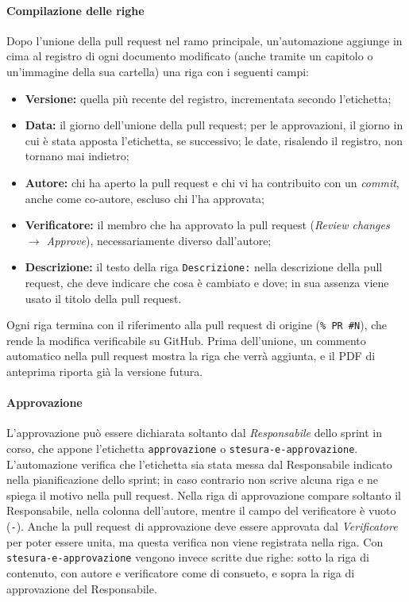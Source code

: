 \documentclass[documento]{gpt}
\begin{document}
	\paragraph{Compilazione delle righe}
	Dopo l'unione della pull request nel ramo principale, un'automazione aggiunge in cima al registro di ogni documento modificato (anche tramite un capitolo o un'immagine della sua cartella) una riga con i seguenti campi:
	\begin{itemize}
		\item \textbf{Versione:} quella più recente del registro, incrementata secondo l'etichetta;
		\item \textbf{Data:} il giorno dell'unione della pull request; per le approvazioni, il giorno in cui è stata apposta l'etichetta, se successivo; le date, risalendo il registro, non tornano mai indietro;
		\item \textbf{Autore:} chi ha aperto la pull request e chi vi ha contribuito con un \textit{commit}, anche come co-autore, escluso chi l'ha approvata;
		\item \textbf{Verificatore:} il membro che ha approvato la pull request (\textit{Review changes $\rightarrow$ Approve}), necessariamente diverso dall'autore;
		\item \textbf{Descrizione:} il testo della riga \texttt{Descrizione:} nella descrizione della pull request, che deve indicare che cosa è cambiato e dove; in sua assenza viene usato il titolo della pull request.
	\end{itemize}
	Ogni riga termina con il riferimento alla pull request di origine (\texttt{\% PR \#N}), che rende la modifica verificabile su GitHub. Prima dell'unione, un commento automatico nella pull request mostra la riga che verrà aggiunta, e il PDF di anteprima riporta già la versione futura.
	
	\paragraph{Approvazione}
	L'approvazione può essere dichiarata soltanto dal \textit{Responsabile} dello sprint in corso, che appone l'etichetta \texttt{approvazione} o \texttt{stesura-e-approvazione}. L'automazione verifica che l'etichetta sia stata messa dal Responsabile indicato nella pianificazione dello sprint; in caso contrario non scrive alcuna riga e ne spiega il motivo nella pull request. Nella riga di approvazione compare soltanto il Responsabile, nella colonna dell'autore, mentre il campo del verificatore è vuoto (\texttt{-}). Anche la pull request di approvazione deve essere approvata dal \textit{Verificatore} per poter essere unita, ma questa verifica non viene registrata nella riga. Con \texttt{stesura-e-approvazione} vengono invece scritte due righe: sotto la riga di contenuto, con autore e verificatore come di consueto, e sopra la riga di approvazione del Responsabile.
	
\end{document}
